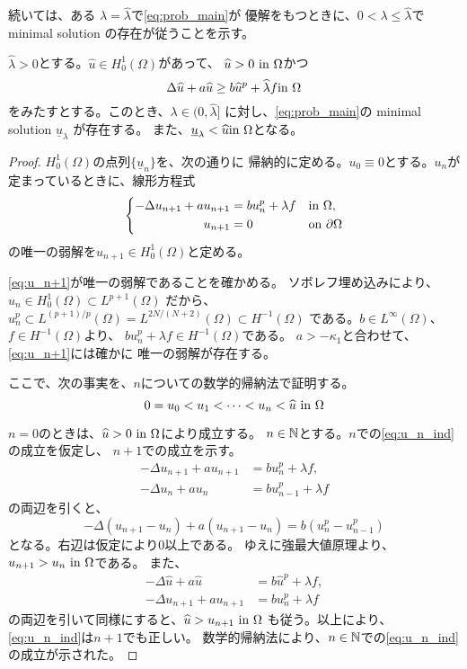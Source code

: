 続いては、ある
$\lambda = \hat{\lambda}$で\ref{eq:prob_main}が
優解をもつときに、$0 < \lambda \leq \hat{\lambda}$で
minimal solution の存在が従うことを示す。

\begin{lem} \label{lem:minimal_itt}
 $\hat{\lambda} > 0$とする。$\hat{u} \in H_0^1(\Omega)$があって、
 $\widehat{u} > 0 ~\text{in}~ \Omega$かつ
 \[
  \Delta \widehat{u} + a\widehat{u} \geq b \widehat{u}^p + \widehat{\lambda}f
 \text{in}~ \Omega
 \]
 をみたすとする。このとき、$\lambda \in (0,\hat{\lambda} ]$
 に対し、\ref{eq:prob_main}の minimal solution $\underline{u}_\lambda$
 が存在する。
 また、$\underline{u}_\lambda < \widehat{u} \text{in}~ \Omega$となる。
\end{lem}

\begin{proof}
 $H_0^1(\Omega)$の点列$\{ \underline{u}_n \}$を、次の通りに
 帰納的に定める。$u_0 \equiv 0$とする。$u_n$が
 定まっているときに、線形方程式
  \begin{align}
   \left\{
   \begin{aligned}
    -\Delta u_{n+1} + a u_{n+1} 
    &= b u_n^p + \lambda f  & &\text{in}~ \Omega,  \\
    u_{n+1} &= 0 & &\text{on}~ \partial\Omega
   \end{aligned}
   \right. \label{eq:u_n+1}
  \end{align}
 の唯一の弱解を$u_{n+1} \in H_0^1(\Omega)$と定める。
 
 \eqref{eq:u_n+1}が唯一の弱解であることを確かめる。
 ソボレフ埋め込みにより、
 $
  u_n \in H_0^1(\Omega) \subset L^{p+1}(\Omega)
 $
 だから、
 $
  u_n^p \subset L^{(p+1)/p}(\Omega)
 = L^{2N/(N+2)}(\Omega) \subset H^{-1}(\Omega)
 $
 である。$b \in L^\infty(\Omega)$、$f \in H^{-1}(\Omega)$より、
 $b u_n^p + \lambda f \in H^{-1}(\Omega)$である。
 $a > -\kappa_1$と合わせて、\eqref{eq:u_n+1}には確かに
 唯一の弱解が存在する。

 ここで、次の事実を、$n$についての数学的帰納法で証明する。
 \begin{equation}
  0 = u_0 < u_1 < \dots < u_n < \widehat{u} ~\text{in}~ \Omega \label{eq:u_n_ind}
 \end{equation}

 $n = 0$のときは、$\widehat{u} > 0 ~\text{in}~ \Omega$により成立する。
 $n \in \mathbb{N}$とする。$n$での\eqref{eq:u_n_ind}の成立を仮定し、
 $n+1$での成立を示す。
 \begin{align*}
  -\Delta u_{n+1} + a u_{n+1} &= b u_n^p + \lambda f, \\
  -\Delta u_{n} + a u_{n} &= b u_{n-1}^p + \lambda f
 \end{align*}
 の両辺を引くと、
 \[
  -\Delta (u_{n+1} - u_n) + a(u_{n+1} - u_n) = b(u_n^p - u_{n-1}^p)
 \]
 となる。右辺は仮定により$0$以上である。
 ゆえに強最大値原理より、$u_{n+1} > u_n ~\text{in}~\Omega$である。
 また、
 \begin{align*}
  -\Delta \hat{u} + a \hat{u} &= b \hat{u}^p + \lambda f, \\
  -\Delta u_{n+1} + a u_{n+1} &= b u_{n}^p + \lambda f
 \end{align*}
 の両辺を引いて同様にすると、$\widehat{u} > u_{n+1} ~\text{in}~\Omega$
 も従う。以上により、\eqref{eq:u_n_ind}は$n+1$でも正しい。
 数学的帰納法により、$n \in \mathbb{N}$での\eqref{eq:u_n_ind}の成立が示された。


\end{proof}
